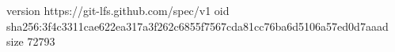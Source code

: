 version https://git-lfs.github.com/spec/v1
oid sha256:3f4c3311cae622ea317a3f262c6855f7567cda81cc76ba6d5106a57ed0d7aaad
size 72793
